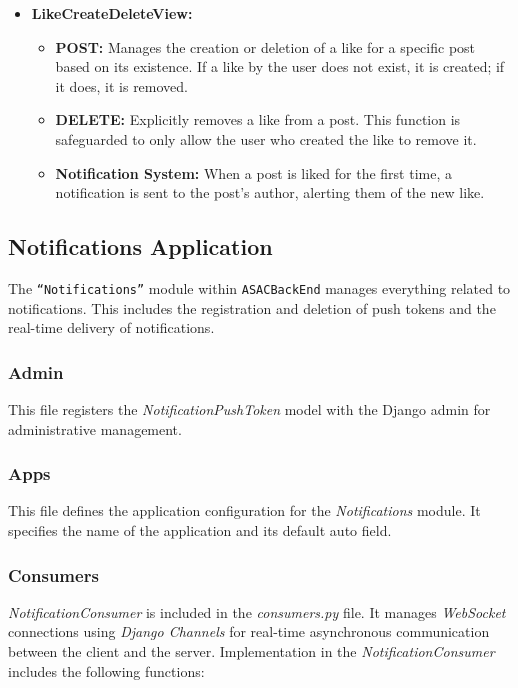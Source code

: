 \begin{itemize}
    \item \textbf{LikeCreateDeleteView:}
    \begin{itemize}
        \item \textbf{POST:} Manages the creation or deletion of a like for a specific post based on its existence. If a like by the user does not exist, it is created; if it does, it is removed.
        \item \textbf{DELETE:} Explicitly removes a like from a post. This function is safeguarded to only allow the user who created the like to remove it.
        \item \textbf{Notification System:} When a post is liked for the first time, a notification is sent to the post's author, alerting them of the new like.
    \end{itemize}
\end{itemize}

\subsection{Notifications Application}

The \texttt{``Notifications''} module within \texttt{ASACBackEnd} manages everything related to notifications. This includes the registration and deletion of push tokens and the real-time delivery of notifications.

\subsubsection{Admin} 

This file registers the \textit{NotificationPushToken} model with the Django admin for administrative management.

\subsubsection{Apps} 

This file defines the application configuration for the \textit{Notifications} module. It specifies the name of the application and its default auto field.

\subsubsection{Consumers}

\textit{NotificationConsumer} is included in the \textit{consumers.py} file. It manages \textit{WebSocket} connections using \textit{Django Channels} for real-time asynchronous communication between the client and the server. Implementation in the \textit{NotificationConsumer} includes the following functions:

